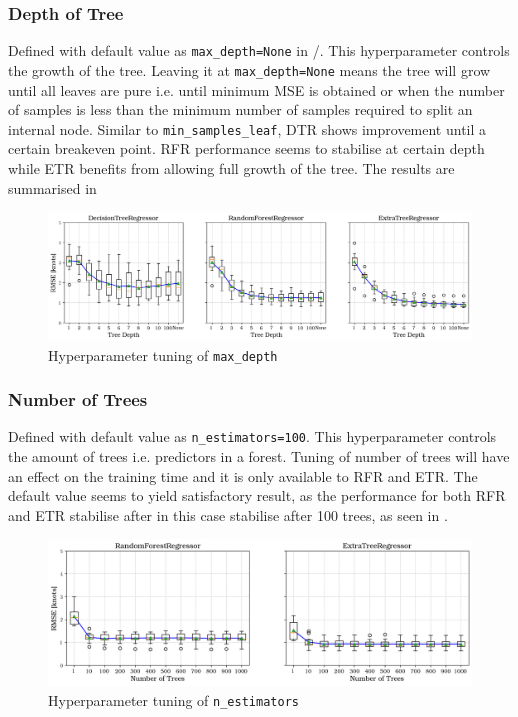 \subsubsection{Depth of Tree}\label{sec:max_depth}

Defined with default value as {\tt max\_depth=None} in \scikit/. This hyperparameter controls the growth of the tree. Leaving it at {\tt max\_depth=None} means the tree will grow until all leaves are pure i.e. until minimum MSE is obtained or when the number of samples is less than the minimum number of samples required to split an internal node. Similar to {\tt min\_samples\_leaf}, DTR shows improvement until a certain breakeven point. RFR performance seems to stabilise at certain depth while ETR benefits from allowing full growth of the tree. The results are summarised in   

\begin{figure}[h]
    \centering
        \includegraphics[width=.95\textwidth]{02_figures/hpo_max_depth.png}
        \caption{Hyperparameter tuning of {\tt max\_depth}}
        \label{fig:hpo_max_depth}
\end{figure}

\subsubsection{Number of Trees}\label{sec:n_estimators}

Defined with default value as {\tt n\_estimators=100}. This hyperparameter controls the amount of trees i.e. predictors in a forest. Tuning of number of trees will have an effect on the training time and it is only available to RFR and ETR. The default value seems to yield satisfactory result, as the performance for both RFR and ETR stabilise after in this case stabilise after 100 trees, as seen in . 

\begin{figure}[h]
    \centering
        \includegraphics[width=.95\textwidth]{02_figures/hpo_n_estimators.png}
        \caption{Hyperparameter tuning of {\tt n\_estimators}}
        \label{fig:n_estimators}
\end{figure}


